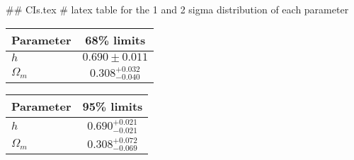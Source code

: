 ## CIs.tex
# latex table for the 1 and 2 sigma distribution of each parameter

\begin{tabular} { l  c}
 Parameter &  68\% limits\\
\hline
{\boldmath$h              $} & $0.690\pm 0.011            $\\
{\boldmath$\Omega_m       $} & $0.308^{+0.032}_{-0.040}   $\\
\hline
\end{tabular}

\begin{tabular} { l  c}
 Parameter &  95\% limits\\
\hline
{\boldmath$h              $} & $0.690^{+0.021}_{-0.021}   $\\
{\boldmath$\Omega_m       $} & $0.308^{+0.072}_{-0.069}   $\\
\hline
\end{tabular}
